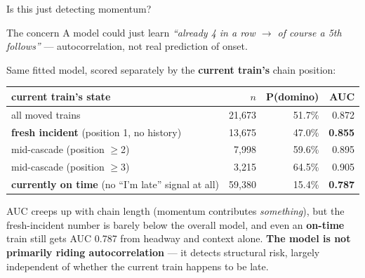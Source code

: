\documentclass[aspectratio=169,10pt]{beamer}
\newcommand{\hl}[1]{{\color{corange}\textbf{#1}}}
\begin{document}
\begin{frame}{Is this just detecting momentum?}
  \begin{alertblock}{\small The concern}
    \small A model could just learn \emph{``already 4 in a row $\to$ of course a
    5th follows''} --- autocorrelation, not real prediction of onset.
  \end{alertblock}

  \vspace{0.4em}
  Same fitted model, scored separately by the \textbf{current train's} chain position:

  \vspace{0.4em}
  \centering
  \begin{tabular}{@{}lrrr@{}}
    \toprule
    current train's state & $n$ & P(domino) & AUC \\
    \midrule
    all moved trains & 21{,}673 & 51.7\% & 0.872 \\
    \textbf{fresh incident} (position 1, no history) & 13{,}675 & 47.0\% & \textbf{0.855} \\
    mid-cascade (position $\geq$2) & 7{,}998 & 59.6\% & 0.895 \\
    mid-cascade (position $\geq$3) & 3{,}215 & 64.5\% & 0.905 \\
    \textbf{currently on time} (no ``I'm late'' signal at all) & 59{,}380 & 15.4\% & \textbf{0.787} \\
    \bottomrule
  \end{tabular}

  \vspace{0.7em}
  \raggedright
  AUC creeps up with chain length (momentum contributes \emph{something}), but the
  fresh-incident number is barely below the overall model, and even an
  \textbf{on-time} train still gets AUC 0.787 from headway and context alone.
  \hl{The model is not primarily riding autocorrelation} --- it detects structural
  risk, largely independent of whether the current train happens to be late.
\end{frame}
\end{document}
